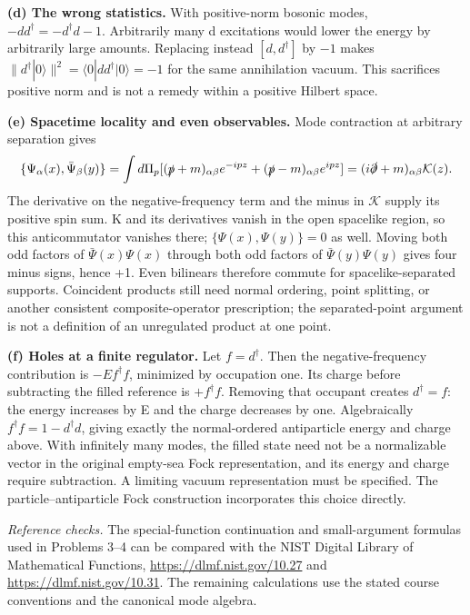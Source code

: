 \documentclass[11pt]{article}
\newcommand{\partsol}[2]{\par\Needspace{4\baselineskip}\medskip\noindent\textbf{(#1) #2.}\quad}
\begin{document}
\partsol{d}{The wrong statistics}
With positive-norm bosonic modes, \(-dd^\dagger=-d^\dagger d-1\).
Arbitrarily many d excitations would lower the energy by arbitrarily
large amounts. Replacing instead \([d,d^\dagger]\) by \(-1\) makes
\(\|d^\dagger|0\rangle\|^2=\langle0|dd^\dagger|0\rangle=-1\)
for the same annihilation vacuum. This sacrifices positive norm and
is not a remedy within a positive Hilbert space.

\partsol{e}{Spacetime locality and even observables}
Mode contraction at arbitrary separation gives
\[
 \{\Psi_\alpha(x),\bar\Psi_\beta(y)\}
 =\int d\Pi_p[(\slashed p+m)_{\alpha\beta}e^{-ipz}
               +(\slashed p-m)_{\alpha\beta}e^{ipz}]
 =(i\slashed\partial+m)_{\alpha\beta}\mathcal K(z).
\]
The derivative on the negative-frequency term and the minus in
\(\mathcal K\) supply its positive spin sum. K and its derivatives
vanish in the open spacelike region, so this anticommutator vanishes
there; \(\{\Psi(x),\Psi(y)\}=0\) as well.
Moving both odd factors of \(\bar\Psi(x)\Psi(x)\) through both odd factors
of \(\bar\Psi(y)\Psi(y)\) gives four minus signs, hence +1.
Even bilinears therefore commute for spacelike-separated supports.
Coincident products still need normal ordering, point splitting, or
another consistent composite-operator prescription; the separated-point
argument is not a definition of an unregulated product at one point.

\partsol{f}{Holes at a finite regulator}
Let \(f=d^\dagger\). Then the negative-frequency contribution is
\(-Ef^\dagger f\), minimized by occupation one. Its charge before
subtracting the filled reference is \(+f^\dagger f\).
Removing that occupant creates \(d^\dagger=f\): the energy increases
by E and the charge decreases by one. Algebraically
\(f^\dagger f=1-d^\dagger d\), giving exactly the normal-ordered
antiparticle energy and charge above. With infinitely many modes, the
filled state need not be a normalizable vector in the original empty-sea
Fock representation, and its energy and charge require subtraction.
A limiting vacuum representation must be specified. The particle--antiparticle
Fock construction incorporates this choice directly.

\par\medskip
{\small\textit{Reference checks.} The special-function continuation and
small-argument formulas used in Problems 3--4 can be compared with the
NIST Digital Library of Mathematical Functions,
\url{https://dlmf.nist.gov/10.27} and \url{https://dlmf.nist.gov/10.31}.
The remaining calculations use the stated course conventions and the
canonical mode algebra.}
\end{document}
